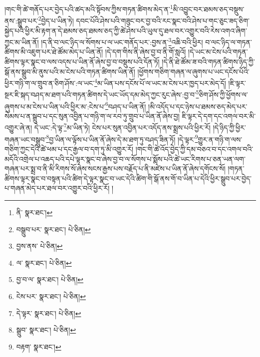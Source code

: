 །གང་གི་ཚེ་གནོད་པར་བྱེད་པའི་ཚད་མའི་སྟོབས་ཀྱིས་གཏན་ཚིགས་མེད་ན་\footnote{ནི་  སྣར་ཐང་། }མི་འབྱུང་བར་ཐམས་ཅད་བསྡུས་ནས་:སྒྲུབ་པར་\footnote{བསྒྲུབ་པར་  སྣར་ཐང་།  པེ་ཅིན། }བྱེད་པ་ཡིན་ཏེ། དབང་པོའི་ཤེས་པའི་གཟུང་བར་བྱ་བའི་རང་སྣང་བའི་ཤེས་པ་གང་ཅུང་ཟད་ཅིག་སྐྱེད་པའི་ཕྱིར་མི་རྟག་ན་དེ་ཐམས་ཅད་ཐམས་ཅད་ཀྱི་ཚེ་ཤེས་པའི་ཡུལ་དུ་ཐལ་བར་འགྱུར་བའི་རེས་འགའ་ཞིག་ཀྱང་མ་ཡིན་ནོ། །ད་ནི་བ་ལང་ཉིད་ལ་སོགས་པ་ལ་ཡང་གནོད་པར་:བྱས་ན་\footnote{བྱས་ནས་  པེ་ཅིན། }འཆི་བའི་ཕྱིར། བ་ལང་ཉིད་ལ་གཏན་ཚིགས་མི་འཇུག་པར་ཐེ་ཚོམ་མེད་པ་ཡིན་ནོ། །དེ་དག་གིས་ནི་ཞེས་བྱ་བ་ནི་གོ་སླའོ། །དེ་ཡང་མ་ངེས་པའི་གཏན་ཚིགས་ལྟར་སྣང་བ་ལས་འདས་པ་ཡིན་ནོ་ཞེས་བྱ་བ་བསྡུས་པའི་དོན་ཏོ། །དེ་ནི་ཐེ་ཚོམ་ཟ་བའི་གཏན་ཚིགས་ཉིད་ཀྱི་སྒོ་ནས་སྒྲུབ་མི་ནུས་པའི་མ་ངེས་པའི་གཏན་ཚིགས་ཡིན་ནོ། །ཕྱོགས་གཅིག་གཞན་ལ་ཞུགས་པ་ཡང་དངོས་པོའི་ཕྱིར་གཉི་ག་ལ་གྲུབ་ན་ཅིག་ཤོས་:ལ་ཡང་\footnote{ལ་  སྣར་ཐང་།  པེ་ཅིན། }མ་ཡིན་པས་དངོས་པོ་ལ་ཡང་མ་ངེས་པར་ཁྱད་པར་མེད་དོ། །ཇི་ལྟར་སྔར་ཇི་སྐད་བཤད་མ་ཐག་པའི་གཏན་ཚིགས་དེ་ཡང་ཡོད་དམ་མེད་ཀྱང་རུང་ཞེས་:བྱ་བ་\footnote{བྱ་བ་ལ་  སྣར་ཐང་།  པེ་ཅིན། }ཅིག་ཤོས་ཀྱི་ཕྱོགས་ལ་ཞུགས་པ་མ་ངེས་པ་ཡིན་པའི་ཕྱིར་མ་:ངེས་པ་\footnote{ངེས་པར་  སྣར་ཐང་།  པེ་ཅིན། }བཤད་པ་ཡིན་ནོ། །མི་འདོད་པ་དང་ཉེས་པ་ཐམས་ཅད་མེད་པར་སེམས་པ་ན་སྒྲུབ་པ་དང་སུན་འབྱིན་པ་གཉི་ག་ལ་རབ་ཏུ་གྲུབ་པ་ཡིན་ནོ་ཞེས་བྱ། ཇི་ལྟར་དེ་དག་དང་འགལ་བར་མི་འགྱུར་ཞེ་ན། དེ་ཡང་:དེ་ལྟ་\footnote{དེ་ལྟར་  སྣར་ཐང་།  པེ་ཅིན། }མ་ཡིན་ཏེ། ངེས་པར་སུན་འབྱིན་པར་འདོད་ནས་སྨྲས་པའི་ཕྱིར་རོ། །དེ་ཉིད་ཀྱི་ཕྱིར་གཞན་ཡང་བསྒྲུབ་\footnote{སྒྲུབ་  སྣར་ཐང་།  པེ་ཅིན། }བྱ་ཡིན་ལ་ལྟོས་པ་ཡིན་ནོ་ཞེས་དེ་མ་ཐག་ཏུ་བཤད་ཟིན་ཏོ། །དེ་ལྟར་\footnote{བརྟག་  སྣར་ཐང་། }གྱུར་ན་གཉི་ག་ལས་གཅིག་ཀྱང་དེའི་ཚེ་ཕམ་པ་དང་རྒྱལ་བ་དག་ཏུ་མི་འགྱུར་རོ། །གང་གི་ཚེ་འོད་བྱེད་ཀྱི་དམ་བཅའ་བ་དང་འགལ་བའི་མདོའི་འགྲེལ་པ་འཆད་པའི་དཔེ་ལྟར་སྣང་བ་ཞེས་བྱ་བ་ལ་སོགས་པ་སྨོས་པའི་ཚེ་ཡང་རིགས་པ་ཅན་ཡན་ལག་གཞན་པར་སྨྲ་བ་ནི་མི་རིགས་སོ་ཞེས་སངས་རྒྱས་པས་བརྗོད་པ་ནི་མཛེས་པ་ཡིན་ནོ་ཞེས་དགོངས་སོ། །གཏན་ཚིགས་ལྟར་སྣང་བ་བསྟན་པའི་ཚིག་དེ་ལྟར་སྣང་བ་ཡང་དེའི་ཚིག་གི་སྒོ་ནས་གོ་བ་ཡིན་པ་དེའི་ཕྱིར་སྒྲུབ་པར་བྱེད་པ་གཞན་མེད་པར་ཐལ་བར་འགྱུར་བའི་ཕྱིར་རོ། །
